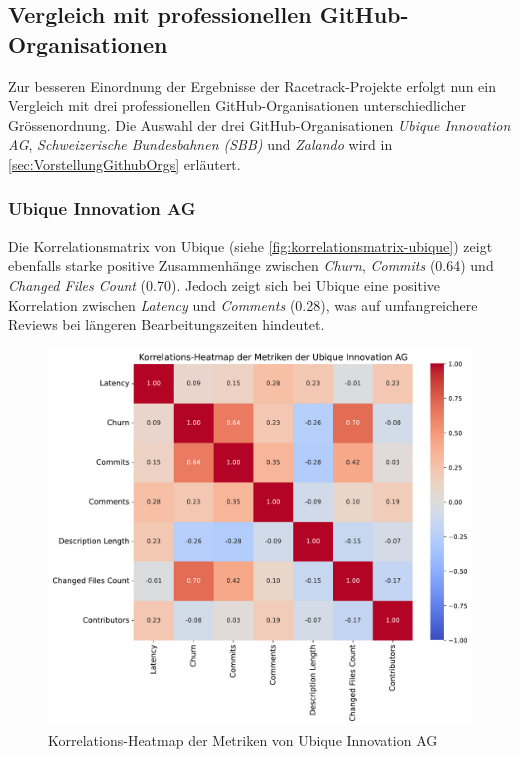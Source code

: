 \newpage
\subsection{Vergleich mit professionellen GitHub-Organisationen}
Zur besseren Einordnung der Ergebnisse der Racetrack-Projekte erfolgt nun ein Vergleich mit drei professionellen GitHub-Organisationen unterschiedlicher Grössenordnung. Die Auswahl der drei GitHub-Organisationen \textit{Ubique Innovation AG}, \textit{Schweizerische Bundesbahnen (SBB)} und \textit{Zalando} wird in \autoref{sec:VorstellungGithubOrgs} erläutert. 


\subsubsection{Ubique Innovation AG}
Die Korrelationsmatrix von Ubique (siehe 
\autoref{fig:korrelationsmatrix-ubique}) zeigt ebenfalls starke positive Zusammenhänge zwischen \textit{Churn}, \textit{Commits} (0.64) und \textit{Changed Files Count} (0.70). Jedoch zeigt sich bei Ubique eine positive Korrelation zwischen \textit{Latency} und \textit{Comments} (0.28), was auf umfangreichere Reviews bei längeren Bearbeitungszeiten hindeutet.

\begin{figure}[htbp]
\includegraphics[width=\textwidth]{Figures/ubique-korrelationsmatrix.pdf}
\caption{Korrelations-Heatmap der Metriken von Ubique Innovation AG}
\label{fig:korrelationsmatrix-ubique}
\end{figure}


